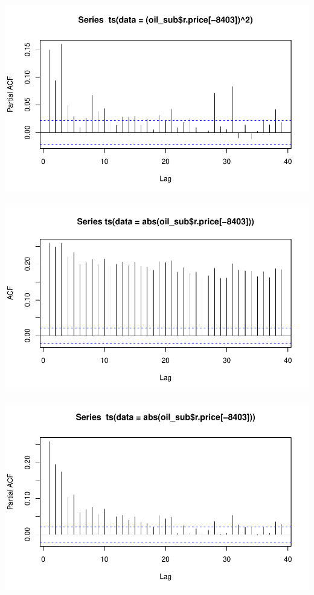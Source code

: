 \documentclass[11pt]{article}\usepackage[]{graphicx}\usepackage[]{color}
\makeatletter
\def\maxwidth{ %
  \ifdim\Gin@nat@width>\linewidth
    \linewidth
  \else
    \Gin@nat@width
  \fi
}
\newenvironment{knitrout}{}{} %
\makeatother
\begin{document}
\begin{knitrout}
{}




{\centering \includegraphics[width=\maxwidth]{figure/abs_plots-10} 

}




{\centering \includegraphics[width=\maxwidth]{figure/abs_plots-11} 

}




{\centering \includegraphics[width=\maxwidth]{figure/abs_plots-12} 

}
\end{knitrout}
\end{document}
